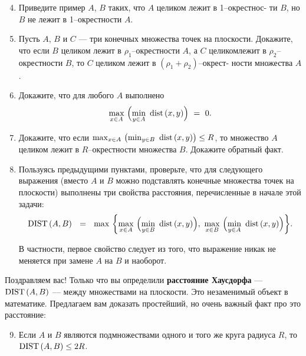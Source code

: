 \begin{enumerate}
\setcounter{enumi}{3}

\item Приведите пример $A$, $B$ таких, что $A$ целиком лежит в 1--окрестнос- ти $B$, но $B$ не лежит в 1--окрестности $A$.

\item Пусть $A$, $B$ и $C$ — три конечных множества точек на плоскости. Докажите, что если $B$ целиком лежит в $\rho_1$--окрестности $A$, а $C$ целиком\linebreak лежит в $\rho_2$--окрестности $B$, то $C$ целиком лежит в $(\rho_1 + \rho_2)$--окрест- ности множества $A$.

\item Докажите, что для любого $A$ выполнено
\vspace{-0.2cm}
$$\max\limits_{x \in A}\ \Bigl(\min\limits_{y \in A}\ \mathrm{dist}\, (x,y)\Bigr)\ =\ 0.$$

\vspace{-0.35cm}
\item Докажите, что если $\max_{x \in A}\ \bigl(\min_{y \in B}\ \dist (x,y)\bigr) \leq R$, то множество $A$ целиком лежит в $R$--окрестности множества $B$. Докажите обратный факт.

\item Пользуясь предыдущими пунктами, проверьте, что для следующего выражения (вместо $A$ и $B$ можно подставлять конечные множества точек на плоскости) выполнены три свойства расстояния, перечисленные в начале этой задачи:
\vspace{-0.2cm}
$$\mathrm{DIST}\, (A,B)\ \ =\ \ \max\ \biggl\{\max\limits_{x \in A}\ \Bigl(\min\limits_{y \in B}\ \mathrm{dist}\, (x,y)\Bigr),
	\ \max\limits_{x \in B}\ \Bigl(\min\limits_{y \in A}\ \mathrm{dist}\, (x,y)\Bigr)\biggr\}.$$

\vspace{-0.2cm} В частности, первое свойство следует из того, что выражение никак не меняется при замене $A$ на $B$ и наоборот.
\end{enumerate}

\noindent Поздравляем вас! Только что вы определили {\bfseries расстояние Хаусдорфа} — $\mathrm{DIST}\, (A,B)$ — между множествами на плоскости. Это незаменимый объект в математике. Предлагаем вам доказать простейший, но очень важный факт про это расстояние:

\begin{enumerate}
\setcounter{enumi}{8}
\item Если $A$ и $B$ являются подмножествами одного и того же круга радиуса $R$, то $\mathrm{DIST}\, (A, B) \leq 2R$.
\end{enumerate}